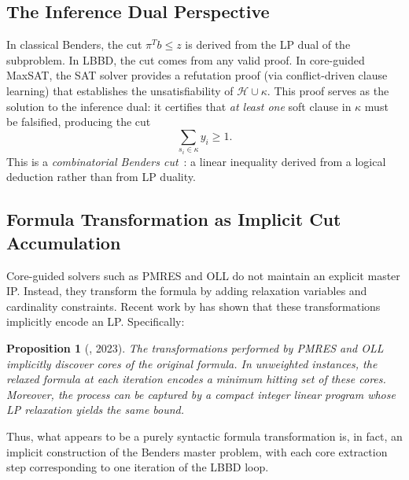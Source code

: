 \documentclass[11pt,a4paper]{article}
\newtheorem{proposition}{Proposition}
\begin{document}
\subsection{The Inference Dual Perspective}

In classical Benders, the cut $\pi^T b \leq z$ is derived from the LP dual of
the subproblem. In LBBD, the cut comes from any valid proof. In core-guided
MaxSAT, the SAT solver provides a refutation proof (via conflict-driven clause
learning) that establishes the unsatisfiability of $\mathcal{H} \cup \kappa$.
This proof serves as the solution to the inference dual: it certifies that
\emph{at least one} soft clause in $\kappa$ must be falsified, producing the
cut
\[
\sum_{s_i \in \kappa} y_i \geq 1.
\]
This is a \emph{combinatorial Benders cut}~\citep{hooker2003logic,codato2006combinatorial}: a linear inequality derived from a logical deduction rather than from LP duality.

\subsection{Formula Transformation as Implicit Cut Accumulation}

Core-guided solvers such as PMRES and OLL do not maintain an explicit master
IP. Instead, they transform the formula by adding relaxation variables and
cardinality constraints. Recent work by \citet{katsirelos2023analysis} has
shown that these transformations implicitly encode an LP. Specifically:

\begin{proposition}[\citeauthor{katsirelos2023analysis}, 2023]
The transformations performed by PMRES and OLL implicitly discover cores of the
original formula. In unweighted instances, the relaxed formula at each
iteration encodes a minimum hitting set of these cores. Moreover, the process
can be captured by a compact integer linear program whose LP relaxation yields
the same bound.
\end{proposition}

Thus, what appears to be a purely syntactic formula transformation is, in
fact, an implicit construction of the Benders master problem, with each core
extraction step corresponding to one iteration of the LBBD loop.
\end{document}
